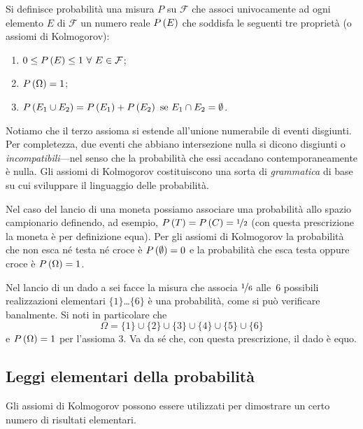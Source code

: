 Si definisce probabilità una misura $P$ su $\mathcal F$ che associ
univocamente ad ogni elemento $E$ di $\mathcal F$ un numero reale $\displaystyle P\left(E\right)$
che soddisfa le seguenti tre proprietà (o assiomi di Kolmogorov):
\begin{enumerate}
\item $0 \leq \displaystyle P\left(E\right) \leq 1~\forall~E \in \mathcal F$;
\item $\displaystyle P\left(\Omega\right) = 1$;
\item $\displaystyle P\left(E_1 \cup E_2\right) = \displaystyle P\left(E_1\right) + \displaystyle P\left(E_2\right)~\text{se}~E_1 \cap E_2 =
  \emptyset$.
\end{enumerate}
Notiamo che il terzo assioma si estende all'unione numerabile di
eventi disgiunti. Per completezza, due eventi che abbiano intersezione nulla
si dicono disgiunti o \emph{incompatibili}---nel senso che la probabilità che
essi accadano contemporaneamente è nulla. Gli assiomi di Kolmogorov
costituiscono una sorta di \emph{grammatica} di base su cui sviluppare il
linguaggio delle probabilità.

\begin{examplebox}
  \begin{example}
    Nel caso del lancio di una moneta possiamo associare una probabilità allo
    spazio campionario definendo, ad esempio,
    $\displaystyle P\left(T\right) = \displaystyle P\left(C\right) = \nicefrac{1}{2}$ (con questa prescrizione la moneta
    è per definizione equa). Per gli assiomi di Kolmogorov la
    probabilità che non esca né testa né croce è $\displaystyle P\left(\emptyset\right) = 0$
    e la probabilità che esca testa oppure croce è $\displaystyle P\left(\Omega\right) = 1$.
  \end{example}

  \begin{example}\label{example:prob_die}
    Nel lancio di un dado a sei facce la misura che associa $\nicefrac{1}{6}$
    alle~$6$ possibili realizzazioni elementari $\{1\}$\ldots$\{6\}$ è una
    probabilità, come si può verificare banalmente. Si noti in particolare
    che
    $$
    \Omega = \{1\} \cup \{2\} \cup \{3\} \cup \{4\} \cup \{5\} \cup \{6\}
    $$
    e $\displaystyle P\left(\Omega\right) = 1$ per l'assioma 3. Va da sé che, con questa
    prescrizione, il dado è equo.
  \end{example}
\end{examplebox}


\subsection{Leggi elementari della probabilità}

Gli assiomi di Kolmogorov possono essere utilizzati per dimostrare un certo
numero di risultati elementari.

